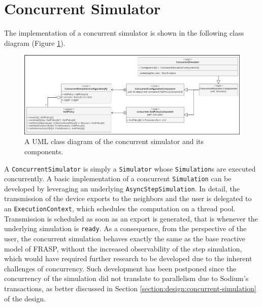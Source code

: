 
\section{Concurrent Simulator}
\label{section:implementation:concurrent-simulator}

The implementation of a concurrent simulator is shown in the following class
diagram (Figure \ref{figure:concurrent-simulator-class-diagram}).

\begin{figure}[!ht]
  \centering
  \includegraphics[width=1\textwidth]{resources/figures/concurrent-simulator-class-diagram.png}
  \caption[A UML class diagram of the concurrent simulator]{
    A UML class diagram of the concurrent simulator and its components.}
  \label{figure:concurrent-simulator-class-diagram}
\end{figure}

A \texttt{ConcurrentSimulator} is simply a \texttt{Simulator} whose
\texttt{Simulation}s are executed concurrently. A basic implementation of a
concurrent \texttt{Simulation} can be developed by leveraging an underlying
\texttt{AsyncStepSimulation}. In detail, the transmission of the device exports
to the neighbors and the user is delegated to an \texttt{ExecutionContext},
which schedules the computation on a thread pool. Transmission is scheduled as
soon as an export is generated, that is whenever the underlying simulation is
\texttt{ready}. As a consequence, from the perspective of the user, the
concurrent simulation behaves exactly the same as the base reactive model of
FRASP, without the increased observability of the step simulation, which would
have required further research to be developed due to the inherent challenges
of concurrency. Such development has been postponed since the concurrency of
the simulation did not translate to parallelism due to Sodium's transactions,
as better discussed in Section \ref{section:design:concurrent-simulation} of
the design.

